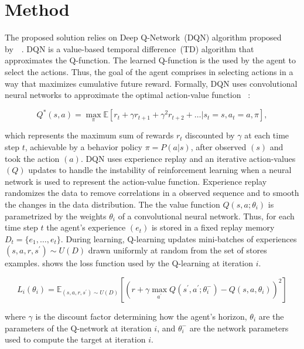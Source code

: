 \documentclass[12pt,english]{article}
\begin{document}
\section{Method}

The proposed solution relies on Deep Q-Network~(DQN) algorithm proposed by~\citeauthor{mnih:15}~\cite{mnih:15}. DQN is a value-based temporal difference~(TD) algorithm that approximates the Q-function. The learned Q-function is the used by the agent to select the actions. Thus, the goal of the agent comprises in selecting actions in a way that maximizes cumulative future reward. Formally, DQN uses convolutional neural networks to approximate the optimal action-value function ~\cite{mnih:15}:

\begin{equation*}\label{eq:optimal-value-function}
Q^{*}(s,a) = \max_{\pi}\mathbb{E}[r_t + \gamma r_{t+1} + \gamma^2 r_{t+2} + \ldots |s_t = s, a_t=a, \pi],
\end{equation*}

\noindent which represents the maximum sum of rewards \(r_t\) discounted by \(\gamma\) at each time step \(t\), achievable by a behavior policy \(\pi = P(a|s)\), after observed \((s)\) and took the action \((a)\). DQN uses experience replay and an iterative action-values \((Q)\) updates to handle the instability of reinforcement learning when a neural network is used to represent the action-value function. Experience replay randomizes the data to remove correlations in a observed sequence and to smooth the changes in the data distribution. The the value function \(Q(s, a; \theta_i)\) is parametrized by the weights \(\theta_i\) of a convolutional neural network. Thus, for each time step \(t\) the agent's experience \((e_t)\) is stored in a fixed replay memory \(D_t = \{e_1, \ldots, e_t\}\). During learning, Q-learning updates mini-batches of experiences \((s, a, r, s^\prime{})\sim{}U(D)\) drawn uniformly at random from the set of stores examples.  shows the loss function used by the Q-learning at iteration \(i\). 

\begin{equation}\label{eq:dqn-loss}
L_i(\theta_i) = \mathbb{E}_{(s,a,r,s^\prime{})\sim{}U(D)}[(r + \gamma\max_{a^\prime{}}Q(s^\prime{},a^\prime{}; \theta^{-}_{i}) - Q(s,a,\theta_{i}))^2]
\end{equation}

\noindent{}where \(\gamma\) is the discount factor determining how the agent's horizon, \(\theta_i\) are the parameters of the Q-network at iteration \(i\), and \(\theta^{-}_{i}\) are the network parameters used to compute the target at iteration \(i\).
\end{document}
